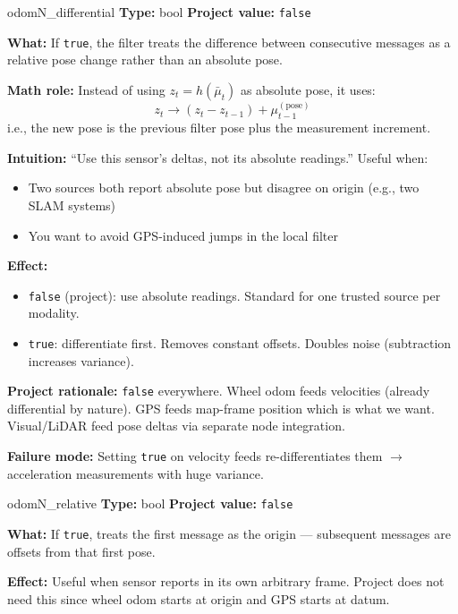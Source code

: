 \documentclass[11pt,a4paper]{article}
\begin{document}
\begin{paramcard}{odomN\_differential}
\textbf{Type:} bool \quad \textbf{Project value:} \texttt{false}

\textbf{What:} If \texttt{true}, the filter treats the difference between consecutive messages as a relative pose change rather than an absolute pose.

\textbf{Math role:} Instead of using $z_t = h(\bar{\mu}_t)$ as absolute pose, it uses:
\[
z_t \to (z_t - z_{t-1}) + \mu_{t-1}^{(\text{pose})}
\]
i.e., the new pose is the previous filter pose plus the measurement increment.

\textbf{Intuition:} ``Use this sensor's deltas, not its absolute readings.'' Useful when:
\begin{itemize}
\item Two sources both report absolute pose but disagree on origin (e.g., two SLAM systems)
\item You want to avoid GPS-induced jumps in the local filter
\end{itemize}

\textbf{Effect:}
\begin{itemize}
\item \texttt{false} (project): use absolute readings. Standard for one trusted source per modality.
\item \texttt{true}: differentiate first. Removes constant offsets. Doubles noise (subtraction increases variance).
\end{itemize}

\textbf{Project rationale:} \texttt{false} everywhere. Wheel odom feeds velocities (already differential by nature). GPS feeds map-frame position which is what we want. Visual/LiDAR feed pose deltas via separate node integration.

\textbf{Failure mode:} Setting \texttt{true} on velocity feeds re-differentiates them $\to$ acceleration measurements with huge variance.
\end{paramcard}

\begin{paramcard}{odomN\_relative}
\textbf{Type:} bool \quad \textbf{Project value:} \texttt{false}

\textbf{What:} If \texttt{true}, treats the first message as the origin --- subsequent messages are offsets from that first pose.

\textbf{Effect:} Useful when sensor reports in its own arbitrary frame. Project does not need this since wheel odom starts at origin and GPS starts at datum.
\end{paramcard}
\end{document}
